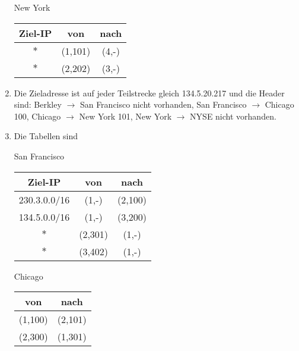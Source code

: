 \documentclass{article}
\begin{document}
\begin{enumerate}[label=(\alph*)]
\begin{minipage}[t]{0.45\textwidth}
\begin{center}
\begin{tabular}{c|c}
				\end{tabular}
			\end{center}
		\end{minipage}
		\begin{minipage}[t]{0.45\textwidth}
			\begin{center}
				New York \\
				\begin{tabular}{c|c|c}
					\textbf{Ziel-IP} & \textbf{von} & \textbf{nach} \\
					\hline
					$\ast$ & (1,101)  & (4,-) \\
					$\ast$ & (2,202) & (3,-)
				\end{tabular}
			\end{center}
		\end{minipage}
		\item Die Zieladresse ist auf jeder Teilstrecke gleich 134.5.20.217 und die Header sind: Berkley $\to$ San Francisco nicht vorhanden, San Francisco $\to$ Chicago  100, Chicago $\to$ New York 101, New York $\to$ NYSE nicht vorhanden.
		\item Die Tabellen sind \\
		\begin{minipage}[t]{0.3\textwidth}
			\begin{center}
				San Francisco \\
				\begin{tabular}{c|c|c}
					\textbf{Ziel-IP} & \textbf{von} & \textbf{nach} \\
					\hline
					230.3.0.0/16 & (1,-)  & (2,100) \\
					134.5.0.0/16 & (1,-) & (3,200) \\
					$\ast$ & (2,301) & (1,-) \\
					$\ast$ & (3,402) & (1,-)
				\end{tabular}
			\end{center}
		\end{minipage}
		\begin{minipage}[t]{0.3\textwidth}
			\begin{center}
				Chicago \\
				\begin{tabular}{c|c}
					\textbf{von} & \textbf{nach} \\
					\hline
					(1,100) & (2,101) \\
					(2,300) & (1,301)
				\end{tabular}
			\end{center}
		\end{minipage}

\end{enumerate}
\end{document}
